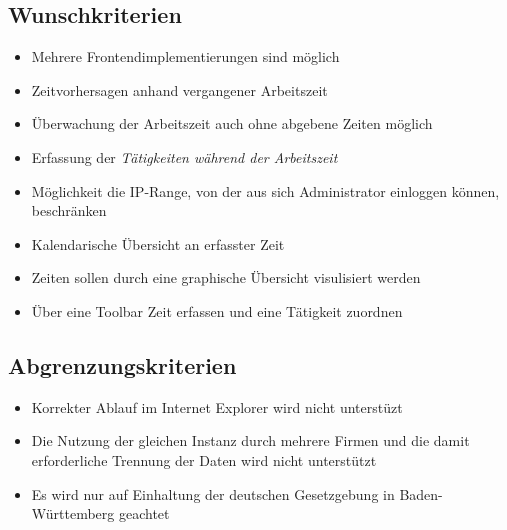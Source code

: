 \subsection{Wunschkriterien}

\begin{itemize}
	\item Mehrere Frontendimplementierungen sind möglich
	\item Zeitvorhersagen anhand vergangener Arbeitszeit
	\item Überwachung der Arbeitszeit auch ohne abgebene Zeiten möglich
	\item Erfassung der \em Tätigkeiten \em während der Arbeitszeit
	\item Möglichkeit die IP-Range, von der aus sich Administrator einloggen können, beschränken
	\item Kalendarische Übersicht an erfasster Zeit
	\item Zeiten sollen durch eine graphische Übersicht visulisiert werden
	\item Über eine Toolbar Zeit erfassen und eine Tätigkeit zuordnen
\end{itemize}


\subsection{Abgrenzungskriterien}
\begin{itemize}
	\item Korrekter Ablauf im Internet Explorer wird nicht unterstüzt
	\item Die Nutzung der gleichen Instanz durch mehrere Firmen und die damit erforderliche Trennung der Daten wird nicht unterstützt
	\item Es wird nur auf Einhaltung der deutschen Gesetzgebung in Baden-Württemberg geachtet
\end{itemize}
